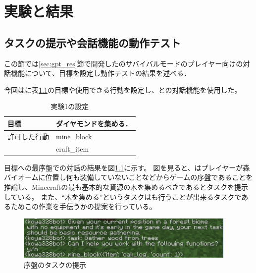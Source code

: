 \chapter{実験と結果}	
\thispagestyle{plain}   %

\section{タスクの提示や会話機能の動作テスト}\label{sec:gpt_res_test}
この節では\ref{sec:gpt_res}節で開発した{\mason}のサバイバルモードのプレイヤー向けの対話機能について、目標を設定し動作テストの結果を述べる．

今回は{\mason}に表\ref{tab:goal_and_action}の目標や使用できる行動を設定し、{\mason}との対話機能を使用した。

\begin{table}[H]
    \caption{実験1の設定}\label{tab:goal_and_action}
    \centering
    \begin{tabular}{ll}
        \hline \hline
        目標 & ダイヤモンドを集める． \\
        \hline
        許可した行動 & mine\_block \\
        　 & craft\_item \\
        \hline
    \end{tabular}
\end{table}

目標への最序盤での対話の結果を図\ref{fig:first_task}に示す。
図を見ると、{\mason}はプレイヤーが森バイオームに位置し何も装備していないことなどからゲームの序盤であることを推論し、Minecraftの最も基本的な資源の木を集めるべきであるとタスクを提示している。
また、``木を集める''というタスクは{\mason}も行うことが出来るタスクであるためこの作業を手伝うかの提案を行っている。

\begin{figure}[H]
    \centering
    \includegraphics[width=0.95\textwidth]{fig/first_task.PNG}
    \caption{序盤のタスクの提示}
    \label{fig:first_task}
\end{figure}

